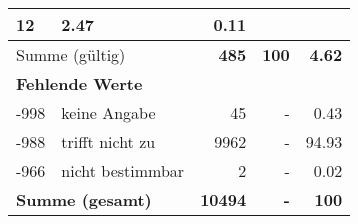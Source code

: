 \begin{longtable}{lXrrr}
       \num{12} &
       \num[round-mode=places,round-precision=2]{2.47} &
         \num[round-mode=places,round-precision=2]{0.11} \\
     \midrule
     \multicolumn{2}{l}{Summe (gültig)} &
       \textbf{\num{485}} &
     \textbf{\num{100}} &
       \textbf{\num[round-mode=places,round-precision=2]{4.62}} \\
     \multicolumn{5}{l}{\textbf{Fehlende Werte}}\\
       -998 &
       keine Angabe &
         \num{45} &
        - &
         \num[round-mode=places,round-precision=2]{0.43} \\
       -988 &
       trifft nicht zu &
         \num{9962} &
        - &
         \num[round-mode=places,round-precision=2]{94.93} \\
       -966 &
       nicht bestimmbar &
         \num{2} &
        - &
         \num[round-mode=places,round-precision=2]{0.02} \\
     \midrule
     \multicolumn{2}{l}{\textbf{Summe (gesamt)}} &
          \textbf{\num{10494}} &
        \textbf{-} &
        \textbf{\num{100}} \\
     \bottomrule
     \end{longtable}
     
